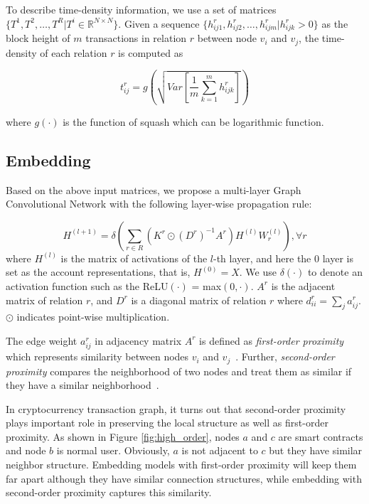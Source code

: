 To describe time-density information, we use a set of matrices $\{T^1,T^2,\dots,T^R|T^i\in \mathbb{R}^{N \times N}\}$. Given a sequence $\{h_{ij1}^r,h_{ij2}^r,\dots,h_{ijm}^r | h_{ijk}^r>0\}$ as the block height of $m$ transactions in relation $r$ between node $v_i$ and $v_j$, the time-density of each relation $r$ is computed as%

\begin{equation}
t_{ij}^r=g(\sqrt{Var[\frac{1}{m}\sum_{k=1}^m h_{ijk}^r]})
\label{eq:time}
\end{equation}

\noindent where $g(\cdot)$ is the function of squash which can be logarithmic function.

\subsection{Embedding}
\label{sec:rGCN layers}
Based on the above input matrices, we propose a multi-layer Graph Convolutional Network with the following layer-wise propagation rule:

\begin{equation}
H^{(l+1)}=\delta(\sum_{r\in R} (K^r\odot (D^r)^{-1}A^r)H^{(l)}W_r^{(l)}),\forall r
\end{equation}
\noindent where $H^{(l)}$ is the matrix of activations of the $l$-th layer, and here the $0$ layer is set as the account representations, that is, $H^{(0)}=X$. We use $\delta(\cdot)$ to denote an activation function such as the ReLU$(\cdot)$ = max$(0,\cdot)$. $A^r$ is the adjacent matrix of relation $r$, and $D^r$ is a diagonal matrix of relation $r$ where $d^r_{ii}=\sum_{j}a^r_{ij}$. $\odot$ indicates point-wise multiplication.

The edge weight $a^r_{ij}$ in adjacency matrix $A^r$ is defined as \emph{first-order proximity} which represents similarity between nodes $v_i$ and $v_j$~\cite{tang2015line}. Further, \emph{second-order proximity} compares the neighborhood of two nodes and treat them as similar if they have a similar neighborhood~\cite{goyal2018graph}.

In cryptocurrency transaction graph, it turns out that second-order proximity plays important role in preserving the local structure as well as first-order proximity. As shown in Figure \ref{fig:high_order}, nodes $a$ and $c$ are smart contracts and node $b$ is normal user. Obviously, $a$ is not adjacent to $c$  but they have similar neighbor structure. Embedding models with first-order proximity will keep them far apart although they have similar connection structures, while embedding with second-order proximity captures this similarity.


